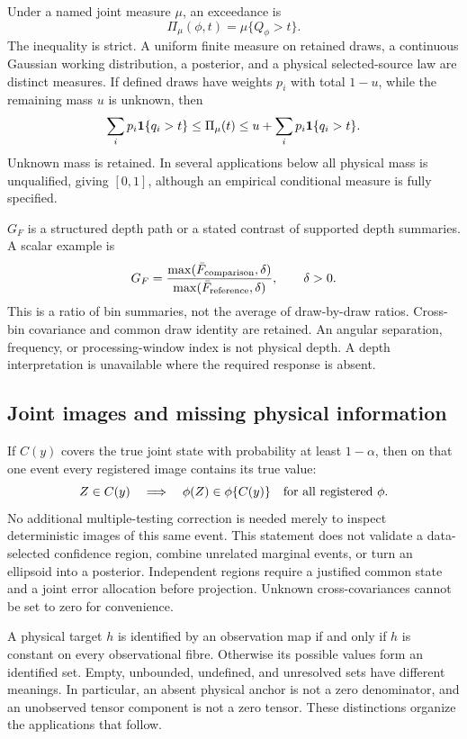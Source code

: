 Under a named joint measure $\mu$, an exceedance is
\begin{equation}
 \Pi_\mu(\phi,t)=\mu\{Q_\phi>t\}.
 \label{eq:pi}
\end{equation}
The inequality is strict. A uniform finite measure on retained draws, a continuous Gaussian working distribution, a posterior, and a physical selected-source law are distinct measures. If defined draws have weights $p_i$ with total $1-u$, while the remaining mass $u$ is unknown, then
\begin{equation}
 \sum_i p_i\mathbf 1\{q_i>t\}\leq\Pi_\mu(t)
 \leq u+\sum_i p_i\mathbf 1\{q_i>t\}.
 \label{eq:unknownmass}
\end{equation}
Unknown mass is retained. In several applications below all physical mass is unqualified, giving $[0,1]$, although an empirical conditional measure is fully specified.

$G_F$ is a structured depth path or a stated contrast of supported depth summaries. A scalar example is
\begin{equation}
 G_F=\frac{\max(\bar F_{\rm comparison},\delta)}{\max(\bar F_{\rm reference},\delta)},\qquad \delta>0.
 \label{eq:gap}
\end{equation}
This is a ratio of bin summaries, not the average of draw-by-draw ratios. Cross-bin covariance and common draw identity are retained. An angular separation, frequency, or processing-window index is not physical depth. A depth interpretation is unavailable where the required response is absent.

\subsection{Joint images and missing physical information}

If $C(y)$ covers the true joint state with probability at least $1-\alpha$, then on that one event every registered image contains its true value:
\begin{equation}
 Z\in C(y)\quad\Longrightarrow\quad
 \phi(Z)\in\phi\{C(y)\}\quad\hbox{for all registered }\phi.
 \label{eq:jointimage}
\end{equation}
No additional multiple-testing correction is needed merely to inspect deterministic images of this same event. This statement does not validate a data-selected confidence region, combine unrelated marginal events, or turn an ellipsoid into a posterior. Independent regions require a justified common state and a joint error allocation before projection. Unknown cross-covariances cannot be set to zero for convenience.

A physical target $h$ is identified by an observation map if and only if $h$ is constant on every observational fibre. Otherwise its possible values form an identified set. Empty, unbounded, undefined, and unresolved sets have different meanings. In particular, an absent physical anchor is not a zero denominator, and an unobserved tensor component is not a zero tensor. These distinctions organize the applications that follow.
